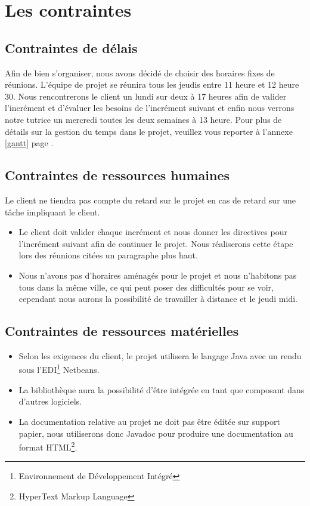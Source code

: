 \documentclass[12pt,a4paper,openany]{article}
\begin{document}
	\section{Les contraintes}
	\subsection{Contraintes de délais}
	Afin de bien s'organiser, nous avons décidé de choisir des horaires fixes de réunions. L'équipe de projet se réunira tous
	les jeudis entre 11 heure et 12 heure 30. Nous rencontrerons le client un lundi sur deux à 17 heures afin de valider l'incrément et d'évaluer les
	besoins de l'incrément suivant et enfin nous verrons notre tutrice un mercredi toutes les deux semaines à 13 heure. 
	Pour plus de détails sur la gestion du temps dans le projet, veuillez vous reporter à l'annexe \ref{gantt} page \pageref{gantt}.
	
	\subsection{Contraintes de ressources humaines}
	Le client ne tiendra pas compte du retard sur le projet en cas de retard sur une tâche impliquant le client. 
	\begin{itemize}
		\item Le client doit valider chaque incrément et nous donner les directives pour l'incrément suivant afin de continuer le projet. Nous réaliserons cette
			étape lors des réunions citées un paragraphe plus haut.
		\item Nous n'avons pas d'horaires aménagés pour le projet et nous n'habitons pas tous dans la même ville, ce qui peut poser des difficultés pour se voir, cependant nous aurons la possibilité de travailler à distance et le jeudi midi.
	\end{itemize}
	\subsection{Contraintes de ressources matérielles}
	\begin{itemize}
		\item Selon les exigences du client, le projet utilisera le langage Java avec un rendu sous l'EDI\footnote{Environnement de Développement Intégré} Netbeans. 
		\item La bibliothèque aura la possibilité d'être intégrée en tant que composant dans d'autres logiciels.
		\item La documentation relative au projet ne doit pas être éditée sur support papier, nous utili\-serons donc Javadoc pour produire une documentation 
			au format HTML\footnote{HyperText Markup Language}.  
	\end{itemize}
	
\end{document}
